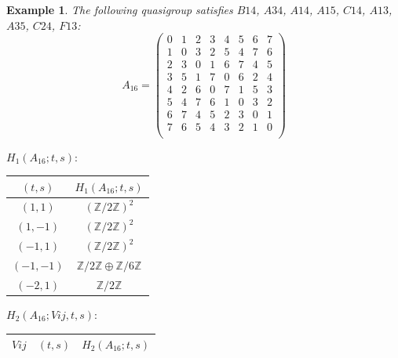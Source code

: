 \documentclass[11pt]{amsart}
\newtheorem{example}[theorem]{Example}
\theoremstyle{definition}
\newcommand{\Z}{\mathbb{Z}}
\begin{document}
\begin{example}
The following quasigroup satisfies 
$B14$, $A34$, $A14$, $A15$, $C14$, $A13$, $A35$, $C24$, $F13$:
   \[ A_{16} = \left(
\begin{array}{cccccccc}
 0 & 1 & 2 & 3 & 4 & 5 & 6 & 7 \\
 1 & 0 & 3 & 2 & 5 & 4 & 7 & 6 \\
 2 & 3 & 0 & 1 & 6 & 7 & 4 & 5 \\
 3 & 5 & 1 & 7 & 0 & 6 & 2 & 4 \\
 4 & 2 & 6 & 0 & 7 & 1 & 5 & 3 \\
 5 & 4 & 7 & 6 & 1 & 0 & 3 & 2 \\
 6 & 7 & 4 & 5 & 2 & 3 & 0 & 1 \\
 7 & 6 & 5 & 4 & 3 & 2 & 1 & 0 \\
\end{array}
\right)\]


\bigskip


$H_1(A_{16};t,s):$

\begin{center}
    
\begin{tabular}{c|c}
    $(t,s)$ & $H_1(A_{16};t,s)$  \\
    \hline
    $(1,1)$ & $(\Z/2\Z)^2$ \\
    $(1,-1)$ & $(\Z/2\Z)^2$ \\
    $(-1,1)$ & $(\Z/2\Z)^2$ \\
    $(-1,-1)$ & $\Z/2\Z \oplus \Z/6\Z$ \\
    $(-2,1)$ & $\Z/2\Z$ \\
\end{tabular}
\end{center}
\bigskip

$H_2(A_{16};Vij,t,s):$

\begin{center}
    
\begin{tabular}{c|c|c}
    $Vij$ & $(t,s)$ & $H_2(A_{16};t,s)$  \\
    \hline


\end{tabular}
\end{center}
\end{example}
\end{document}
